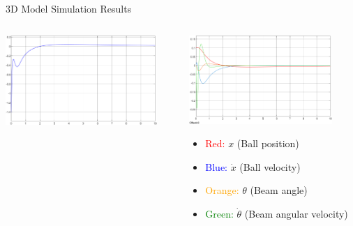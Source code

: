 \documentclass{beamer}
\begin{document}
\begin{frame}{3D Model Simulation Results}
    \centering
    \begin{columns}[T] %
        \begin{column}{0.48\textwidth}
            \includegraphics[width=0.9\textwidth]{Figures/control_input_scope.png}
        \end{column}
        \begin{column}{0.48\textwidth}
            \includegraphics[width=0.85\textwidth]{Figures/states_scope.png}
	    \begin{itemize}
		\tiny
                \item \textcolor{red}{Red:} \(x\) (Ball position)
                \item \textcolor{blue}{Blue:} \(\dot{x}\) (Ball velocity)
                \item \textcolor{orange}{Orange:} \(\theta\) (Beam angle)
                \item \textcolor{green}{Green:} \(\dot{\theta}\) (Beam angular velocity)

\end{itemize}
\end{column}
\end{columns}
\end{frame}
\end{document}
